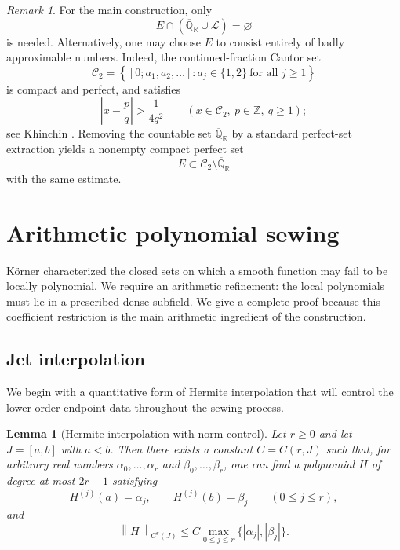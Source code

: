\documentclass[11pt,reqno]{amsart}
\numberwithin{equation}{section}
\newtheorem{lemma}[theorem]{Lemma}
\theoremstyle{definition}
\theoremstyle{remark}
\newtheorem{remark}[theorem]{Remark}
\newcommand{\Z}{\mathbb Z}
\newcommand{\Ralg}{\overline{\mathbb Q}_{\mathbb R}}
\newcommand{\Lio}{\mathscr L}
\newcommand{\norm}[1]{\left\lVert #1\right\rVert}
\newcommand{\abs}[1]{\left|#1\right|}
\newcommand{\set}[1]{\left\{#1\right\}}
\begin{document}
\begin{remark}\label{rem:badly-approximable}
For the main construction, only
\[
E\cap(\Ralg\cup\Lio)=\varnothing
\]
is needed. Alternatively, one may choose $E$ to consist entirely of badly approximable numbers. Indeed, the continued-fraction Cantor set
\[
\mathcal C_2
=
\set{[0;a_1,a_2,\ldots]:a_j\in\{1,2\}\ \text{for all }j\geq1}
\]
is compact and perfect, and satisfies
\[
\abs{x-\frac pq}>\frac1{4q^2}
\qquad
(x\in\mathcal C_2,\ p\in\Z,\ q\geq1);
\]
see Khinchin \cite[Chapters~I--II]{Khinchin1997}. Removing the countable set $\Ralg$ by a standard perfect-set extraction yields a nonempty compact perfect set
\[
E\subset\mathcal C_2\setminus\Ralg
\]
with the same estimate.
\end{remark}

\section{Arithmetic polynomial sewing}\label{sec:sewing}

Körner \cite{Korner2007} characterized the closed sets on which a smooth function may fail to be locally polynomial.  We require an arithmetic refinement: the local polynomials must lie in a prescribed dense subfield.  We give a complete proof because this coefficient restriction is the main arithmetic ingredient of the construction.

\subsection*{Jet interpolation}

We begin with a quantitative form of Hermite interpolation that will control the lower-order endpoint data throughout the sewing process.

\begin{lemma}[Hermite interpolation with norm control]\label{lem:hermite}
Let $r\geq0$ and let $J=[a,b]$ with $a<b$. Then there exists a constant $C=C(r,J)$ such that, for arbitrary real numbers $\alpha_0,\dots,\alpha_r$ and $\beta_0,\dots,\beta_r$, one can find a polynomial $H$ of degree at most $2r+1$ satisfying
\[
 H^{(j)}(a)=\alpha_j,
 \qquad
 H^{(j)}(b)=\beta_j
 \qquad(0\leq j\leq r),
\]
and
\[
 \norm{H}_{C^r(J)}
 \leq C\max_{0\leq j\leq r}\{ |\alpha_j|,|\beta_j|\}.
\]
\end{lemma}
\end{document}
